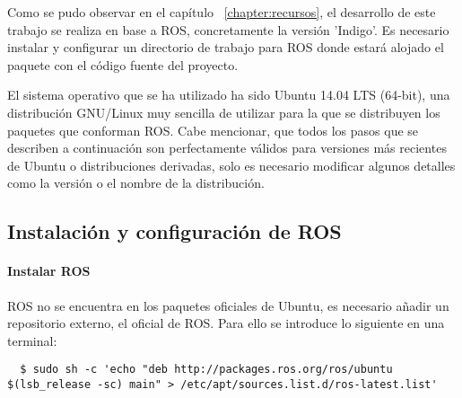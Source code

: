 

Como se pudo observar en el capítulo ~\ref{chapter:recursos}, el desarrollo de
este trabajo se realiza en base a ROS, concretamente la versión 'Indigo'. Es
necesario instalar y configurar un directorio de trabajo para ROS donde estará
alojado el paquete con el código fuente del proyecto.

El sistema operativo que se ha utilizado ha sido Ubuntu 14.04 LTS (64-bit), una
distribución GNU/Linux muy sencilla de utilizar para la que se distribuyen los
paquetes que conforman ROS. Cabe mencionar, que todos los pasos que se
describen a continuación son perfectamente válidos para versiones más recientes
de Ubuntu o distribuciones derivadas, solo es necesario modificar algunos
detalles como la versión o el nombre de la distribución. 

\subsection{Instalación y configuración de ROS}

\paragraph{Instalar ROS} \hspace{0pt}

ROS no se encuentra en los paquetes oficiales de Ubuntu, es necesario añadir un
repositorio externo, el oficial de ROS. Para ello se introduce lo siguiente en
una terminal:
\\
\begin{lstlisting}
  $ sudo sh -c 'echo "deb http://packages.ros.org/ros/ubuntu $(lsb_release -sc) main" > /etc/apt/sources.list.d/ros-latest.list'
\end{lstlisting}

